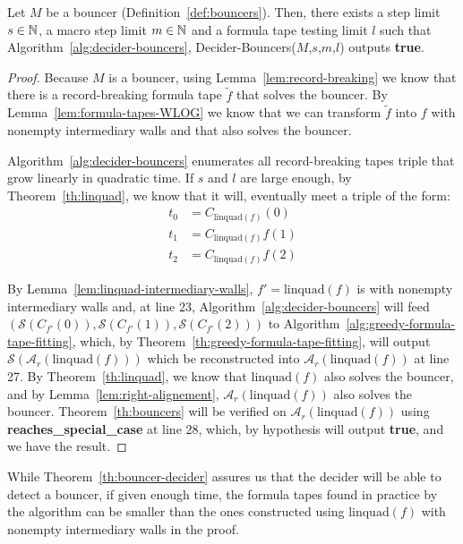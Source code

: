 \begin{theorem}\label{th:bouncer-decider}
    Let $M$ be a bouncer (Definition~\ref{def:bouncers}). Then, there exists a step limit $s\in\mathbb{N}$, a macro step limit $m\in\mathbb{N}$ and a formula tape testing limit $l$ such that Algorithm~\ref{alg:decider-bouncers}, {\sc Decider-Bouncers}($M$,$s$,$m$,$l$) outputs \textbf{true}.
\end{theorem}
\begin{proof}
    Because $M$ is a bouncer, using Lemma~\ref{lem:record-breaking} we know that there is a record-breaking formula tape $\tilde{f}$ that solves the bouncer. By Lemma~\ref{lem:formula-tapes-WLOG} we know that we can transform $\tilde{f}$ into $f$ with nonempty intermediary walls and that also solves the bouncer.

    Algorithm~\ref{alg:decider-bouncers} enumerates all record-breaking tapes triple that grow linearly in quadratic time. If $s$ and $l$ are large enough, by Theorem~\ref{th:linquad}, we know that it will, eventually meet a triple of the form: \begin{align*}
        t_0 & = C_{\text{linquad}(f)}(0)  \\
        t_1 & = C_{\text{linquad}(f)}f(1) \\
        t_2 & = C_{\text{linquad}(f)}f(2)
    \end{align*}

    By Lemma~\ref{lem:linquad-intermediary-walls}, $f'=\text{linquad}(f)$ is with nonempty intermediary walls and, at line 23, Algorithm~\ref{alg:decider-bouncers} will feed $(\mathcal{S}(C_{f'}(0)),\mathcal{S}(C_{f'}(1)),\mathcal{S}(C_{f'}(2)))$ to Algorithm~\ref{alg:greedy-formula-tape-fitting}, which, by Theorem~\ref{th:greedy-formula-tape-fitting}, will output $\mathcal{S}(\mathcal{A}_r(\text{linquad}(f)))$ which be reconstructed into $\mathcal{A}_r(\text{linquad}(f))$ at line 27. By Theorem~\ref{th:linquad}, we know that $\text{linquad}(f)$ also solves the bouncer, and by Lemma~\ref{lem:right-alignement}, $\mathcal{A}_r(\text{linquad}(f))$ also solves the bouncer. Theorem~\ref{th:bouncers} will be verified on $\mathcal{A}_r(\text{linquad}(f))$ using \textbf{reaches\_special\_case} at line 28, which, by hypothesis will output \textbf{true}, and we have the result.
\end{proof}

\begin{remark}
    While Theorem~\ref{th:bouncer-decider} assures us that the decider will be able to detect a bouncer, if given enough time, the formula tapes found in practice by the algorithm can be smaller than the ones constructed using $\text{linquad}(f)$ with nonempty intermediary walls in the proof.
\end{remark}

